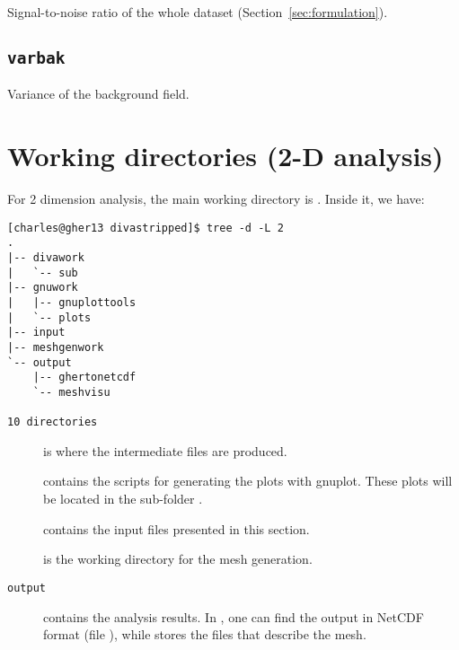 Signal-to-noise ratio of the whole dataset (Section~\ref{sec:formulation}).


\subsection{\texttt{varbak}}

Variance of the background field.



\section{Working directories (2-D analysis)}

For 2 dimension analysis, the main working directory is . Inside it, we have:
\begin{lstlisting}[style=Bash]
[charles@gher13 divastripped]$ tree -d -L 2
.
|-- divawork
|   `-- sub
|-- gnuwork
|   |-- gnuplottools
|   `-- plots
|-- input
|-- meshgenwork
`-- output
    |-- ghertonetcdf
    `-- meshvisu

10 directories
\end{lstlisting}


\begin{description}

\item[] is where the intermediate files are produced.
\item[] contains the scripts for generating the plots with gnuplot. These plots will be located in the sub-folder .
\item[] contains the input files presented in this section.
\item[] is the working directory for the mesh generation.
\item[\texttt{output}] contains the analysis results. In , one can find the output in NetCDF format (file ), while  stores the files that describe the mesh.
\end{description}